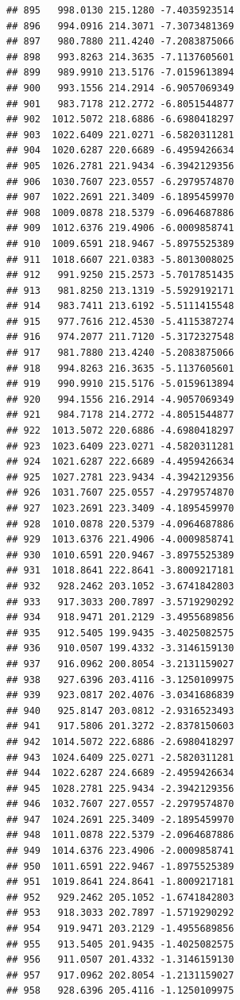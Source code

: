 \documentclass[
]{article}
\begin{document}
\begin{verbatim}
## 895   998.0130 215.1280 -7.4035923514
## 896   994.0916 214.3071 -7.3073481369
## 897   980.7880 211.4240 -7.2083875066
## 898   993.8263 214.3635 -7.1137605601
## 899   989.9910 213.5176 -7.0159613894
## 900   993.1556 214.2914 -6.9057069349
## 901   983.7178 212.2772 -6.8051544877
## 902  1012.5072 218.6886 -6.6980418297
## 903  1022.6409 221.0271 -6.5820311281
## 904  1020.6287 220.6689 -6.4959426634
## 905  1026.2781 221.9434 -6.3942129356
## 906  1030.7607 223.0557 -6.2979574870
## 907  1022.2691 221.3409 -6.1895459970
## 908  1009.0878 218.5379 -6.0964687886
## 909  1012.6376 219.4906 -6.0009858741
## 910  1009.6591 218.9467 -5.8975525389
## 911  1018.6607 221.0383 -5.8013008025
## 912   991.9250 215.2573 -5.7017851435
## 913   981.8250 213.1319 -5.5929192171
## 914   983.7411 213.6192 -5.5111415548
## 915   977.7616 212.4530 -5.4115387274
## 916   974.2077 211.7120 -5.3172327548
## 917   981.7880 213.4240 -5.2083875066
## 918   994.8263 216.3635 -5.1137605601
## 919   990.9910 215.5176 -5.0159613894
## 920   994.1556 216.2914 -4.9057069349
## 921   984.7178 214.2772 -4.8051544877
## 922  1013.5072 220.6886 -4.6980418297
## 923  1023.6409 223.0271 -4.5820311281
## 924  1021.6287 222.6689 -4.4959426634
## 925  1027.2781 223.9434 -4.3942129356
## 926  1031.7607 225.0557 -4.2979574870
## 927  1023.2691 223.3409 -4.1895459970
## 928  1010.0878 220.5379 -4.0964687886
## 929  1013.6376 221.4906 -4.0009858741
## 930  1010.6591 220.9467 -3.8975525389
## 931  1018.8641 222.8641 -3.8009217181
## 932   928.2462 203.1052 -3.6741842803
## 933   917.3033 200.7897 -3.5719290292
## 934   918.9471 201.2129 -3.4955689856
## 935   912.5405 199.9435 -3.4025082575
## 936   910.0507 199.4332 -3.3146159130
## 937   916.0962 200.8054 -3.2131159027
## 938   927.6396 203.4116 -3.1250109975
## 939   923.0817 202.4076 -3.0341686839
## 940   925.8147 203.0812 -2.9316523493
## 941   917.5806 201.3272 -2.8378150603
## 942  1014.5072 222.6886 -2.6980418297
## 943  1024.6409 225.0271 -2.5820311281
## 944  1022.6287 224.6689 -2.4959426634
## 945  1028.2781 225.9434 -2.3942129356
## 946  1032.7607 227.0557 -2.2979574870
## 947  1024.2691 225.3409 -2.1895459970
## 948  1011.0878 222.5379 -2.0964687886
## 949  1014.6376 223.4906 -2.0009858741
## 950  1011.6591 222.9467 -1.8975525389
## 951  1019.8641 224.8641 -1.8009217181
## 952   929.2462 205.1052 -1.6741842803
## 953   918.3033 202.7897 -1.5719290292
## 954   919.9471 203.2129 -1.4955689856
## 955   913.5405 201.9435 -1.4025082575
## 956   911.0507 201.4332 -1.3146159130
## 957   917.0962 202.8054 -1.2131159027
## 958   928.6396 205.4116 -1.1250109975

\end{verbatim}
\end{document}

